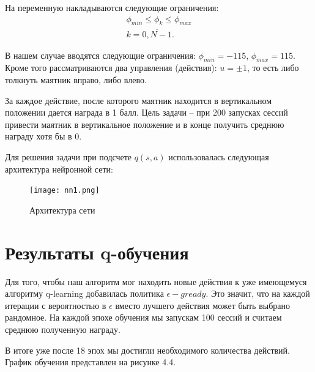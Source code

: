 На переменную накладываются следующие ограничения:
\begin{equation}
	\begin{aligned}
		\phi_{min} \leq \phi_k \leq \phi_{max} \\
		k = \overline{0, N-1}.
	\end{aligned}
\end{equation}

В нашем случае вводятся следующие ограничения:
$\phi_{min} = -115$,  $\phi_{max} = 115$. 
Кроме того рассматриваются два управления (действия): $u = \pm 1$, то есть либо толкнуть маятник вправо, либо влево.

За каждое действие, после которого маятник находится в вертикальном положении дается награда в 1 балл. Цель задачи -- при 200 запусках сессий  привести маятник в вертикальное положение и в конце получить среднюю награду хотя бы в 0.



Для решения задачи при подсчете $q(s, a)$ использовалась следующая архитектура нейронной сети: 
\begin{figure}[!h]
\caption {Архитектура сети}
	\centering
	\texttt{[image: nn1.png]}
	\label{fig:agent}
\end{figure}
 

\newpage

\section{Результаты q-обучения}\label{1sec:optimal-control}

Для того, чтобы наш алгоритм мог находить новые действия к уже имеющемуся алгоритму q-learning добавилась политика $\epsilon-gready$. Это значит, что на каждой итерации с вероятностью в $\epsilon$ вместо лучшего действия может быть выбрано рандомное. На каждой эпохе обучения мы запускам 100 сессий и считаем среднюю полученную награду. 

В итоге уже после 18 эпох мы достигли необходимого количества действий. График обучения представлен на рисунке 4.4.

